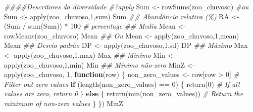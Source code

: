 \documentclass[
  letterpaper,
  DIV=11,
  numbers=noendperiod]{scrartcl}
\newenvironment{Shaded}{}{}
\newcommand{\CommentTok}[1]{\textcolor[rgb]{0.38,0.63,0.69}{\textit{#1}}}
\newcommand{\ControlFlowTok}[1]{\textcolor[rgb]{0.00,0.44,0.13}{\textbf{#1}}}
\newcommand{\DecValTok}[1]{\textcolor[rgb]{0.25,0.63,0.44}{#1}}
\newcommand{\DocumentationTok}[1]{\textcolor[rgb]{0.73,0.13,0.13}{\textit{#1}}}
\newcommand{\FunctionTok}[1]{\textcolor[rgb]{0.02,0.16,0.49}{#1}}
\newcommand{\NormalTok}[1]{#1}
\newcommand{\OtherTok}[1]{\textcolor[rgb]{0.00,0.44,0.13}{#1}}
\newcommand{\SpecialCharTok}[1]{\textcolor[rgb]{0.25,0.44,0.63}{#1}}
\begin{document}
\begin{Shaded}
\begin{Highlighting}[numbers=left,,]
\DocumentationTok{\#\#\#\#Descritores da diversidade}
\CommentTok{\#?apply}
\NormalTok{Sum }\OtherTok{\textless{}{-}} \FunctionTok{rowSums}\NormalTok{(zoo\_chuvoso)}
\CommentTok{\#ou}
\NormalTok{Sum }\OtherTok{\textless{}{-}} \FunctionTok{apply}\NormalTok{(zoo\_chuvoso,}\DecValTok{1}\NormalTok{,sum)}
\NormalTok{Sum}
\DocumentationTok{\#\# Abundância relativa (\%)}
\NormalTok{RA }\OtherTok{\textless{}{-}}\NormalTok{ (Sum }\SpecialCharTok{/} \FunctionTok{sum}\NormalTok{(Sum)) }\SpecialCharTok{*} \DecValTok{100} \CommentTok{\# percentage}
\DocumentationTok{\#\# Media}
\NormalTok{Mean }\OtherTok{\textless{}{-}} \FunctionTok{rowMeans}\NormalTok{(zoo\_chuvoso)}
\NormalTok{Mean}
\DocumentationTok{\#\# Ou}
\NormalTok{Mean }\OtherTok{\textless{}{-}} \FunctionTok{apply}\NormalTok{(zoo\_chuvoso,}\DecValTok{1}\NormalTok{,mean)}
\NormalTok{Mean}
\DocumentationTok{\#\# Desvio padrão}
\NormalTok{DP }\OtherTok{\textless{}{-}} \FunctionTok{apply}\NormalTok{(zoo\_chuvoso,}\DecValTok{1}\NormalTok{,sd)}
\NormalTok{DP}
\DocumentationTok{\#\# Máximo}
\NormalTok{Max }\OtherTok{\textless{}{-}} \FunctionTok{apply}\NormalTok{(zoo\_chuvoso,}\DecValTok{1}\NormalTok{,max)}
\NormalTok{Max }
\DocumentationTok{\#\# Mínimo}
\NormalTok{Min }\OtherTok{\textless{}{-}} \FunctionTok{apply}\NormalTok{(zoo\_chuvoso,}\DecValTok{1}\NormalTok{,min)}
\NormalTok{Min}
\DocumentationTok{\#\# Mínimo não{-}zero}
\NormalTok{MinZ }\OtherTok{\textless{}{-}} \FunctionTok{apply}\NormalTok{(zoo\_chuvoso, }\DecValTok{1}\NormalTok{, }\ControlFlowTok{function}\NormalTok{(row) \{}
\NormalTok{  non\_zero\_values }\OtherTok{\textless{}{-}}\NormalTok{ row[row }\SpecialCharTok{\textgreater{}} \DecValTok{0}\NormalTok{]  }\CommentTok{\# Filter out zero values}
  \ControlFlowTok{if}\NormalTok{ (}\FunctionTok{length}\NormalTok{(non\_zero\_values) }\SpecialCharTok{==} \DecValTok{0}\NormalTok{) \{}
    \FunctionTok{return}\NormalTok{(}\DecValTok{0}\NormalTok{)  }\CommentTok{\# If all values are zero, return 0}
\NormalTok{  \} }\ControlFlowTok{else}\NormalTok{ \{}
    \FunctionTok{return}\NormalTok{(}\FunctionTok{min}\NormalTok{(non\_zero\_values))  }\CommentTok{\# Return the minimum of non{-}zero values}
\NormalTok{  \}}
\NormalTok{\})}
\NormalTok{MinZ}


\end{Highlighting}
\end{Shaded}
\end{document}
